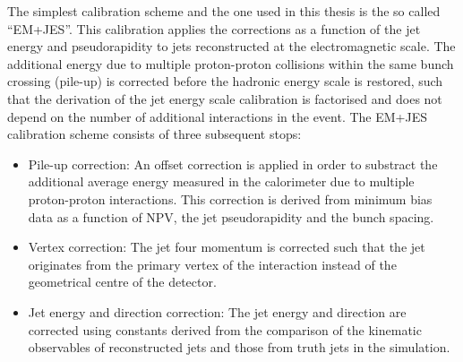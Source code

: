 The simplest calibration scheme and the one used in this thesis is the so called ``EM+JES''. This calibration applies the corrections as a function of the jet energy and pseudorapidity to jets reconstructed at the electromagnetic scale.  The additional energy due to multiple proton-proton collisions within the same bunch crossing (pile-up) is corrected before the hadronic energy scale is restored, such that the derivation of the jet energy scale calibration is factorised and does not depend on the number of additional interactions in the event. The EM+JES calibration scheme consists of three subsequent stops:

\begin{itemize}
\item
Pile-up correction: An offset correction is applied in order to substract the additional average energy measured in the calorimeter due to multiple proton-proton interactions. This correction is derived from minimum bias data as a function of NPV, the jet pseudorapidity and the bunch spacing.
\item
Vertex correction: The jet four momentum is corrected such that the jet originates from the primary vertex of the interaction instead of the geometrical centre of the detector. 
\item
Jet energy and direction correction: The jet energy and direction are corrected using constants derived from the comparison of the kinematic observables of reconstructed jets and those from truth jets in the simulation.


\end{itemize}
